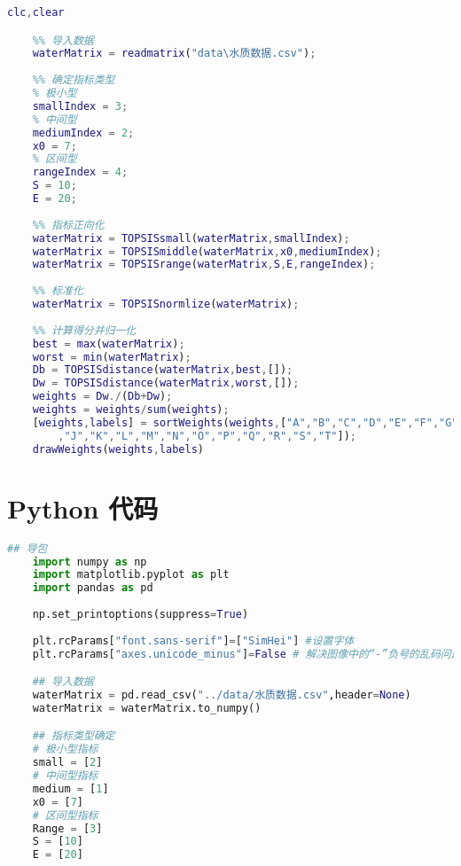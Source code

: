 \documentclass[withoutpreface]{cumcmthesis}
\begin{document}
    \begin{lstlisting}[language=matlab,caption={TOPSIS主体}]
    clc,clear

    %% 导入数据
    waterMatrix = readmatrix("data\水质数据.csv");
    
    %% 确定指标类型
    % 极小型
    smallIndex = 3;
    % 中间型
    mediumIndex = 2;
    x0 = 7;
    % 区间型
    rangeIndex = 4;
    S = 10;
    E = 20;
    
    %% 指标正向化
    waterMatrix = TOPSISsmall(waterMatrix,smallIndex);
    waterMatrix = TOPSISmiddle(waterMatrix,x0,mediumIndex);
    waterMatrix = TOPSISrange(waterMatrix,S,E,rangeIndex);
    
    %% 标准化
    waterMatrix = TOPSISnormlize(waterMatrix);
    
    %% 计算得分并归一化
    best = max(waterMatrix);
    worst = min(waterMatrix);
    Db = TOPSISdistance(waterMatrix,best,[]);
    Dw = TOPSISdistance(waterMatrix,worst,[]);
    weights = Dw./(Db+Dw);
    weights = weights/sum(weights);
    [weights,labels] = sortWeights(weights,["A","B","C","D","E","F","G","H","I" ...
        ,"J","K","L","M","N","O","P","Q","R","S","T"]);
    drawWeights(weights,labels)
    \end{lstlisting}

    \section{Python 代码}

    \begin{lstlisting}[language=python ,caption={参数初始化} ]
    ## 导包
    import numpy as np
    import matplotlib.pyplot as plt
    import pandas as pd
    
    np.set_printoptions(suppress=True)
    
    plt.rcParams["font.sans-serif"]=["SimHei"] #设置字体
    plt.rcParams["axes.unicode_minus"]=False # 解决图像中的“-”负号的乱码问题

    ## 导入数据
    waterMatrix = pd.read_csv("../data/水质数据.csv",header=None)
    waterMatrix = waterMatrix.to_numpy()

    ## 指标类型确定
    # 极小型指标
    small = [2]
    # 中间型指标
    medium = [1]
    x0 = [7]
    # 区间型指标
    Range = [3]
    S = [10]
    E = [20]
    \end{lstlisting}
\end{document}
